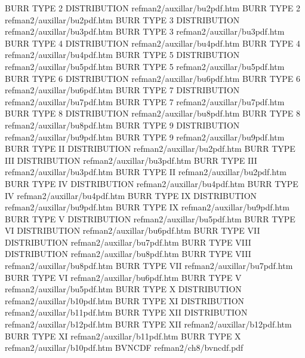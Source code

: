 BURR TYPE 2 DISTRIBUTION                refman2/auxillar/bu2pdf.htm
BURR TYPE 2                             refman2/auxillar/bu2pdf.htm
BURR TYPE 3 DISTRIBUTION                refman2/auxillar/bu3pdf.htm
BURR TYPE 3                             refman2/auxillar/bu3pdf.htm
BURR TYPE 4 DISTRIBUTION                refman2/auxillar/bu4pdf.htm
BURR TYPE 4                             refman2/auxillar/bu4pdf.htm
BURR TYPE 5 DISTRIBUTION                refman2/auxillar/bu5pdf.htm
BURR TYPE 5                             refman2/auxillar/bu5pdf.htm
BURR TYPE 6 DISTRIBUTION                refman2/auxillar/bu6pdf.htm
BURR TYPE 6                             refman2/auxillar/bu6pdf.htm
BURR TYPE 7 DISTRIBUTION                refman2/auxillar/bu7pdf.htm
BURR TYPE 7                             refman2/auxillar/bu7pdf.htm
BURR TYPE 8 DISTRIBUTION                refman2/auxillar/bu8pdf.htm
BURR TYPE 8                             refman2/auxillar/bu8pdf.htm
BURR TYPE 9 DISTRIBUTION                refman2/auxillar/bu9pdf.htm
BURR TYPE 9                             refman2/auxillar/bu9pdf.htm
BURR TYPE II DISTRIBUTION               refman2/auxillar/bu2pdf.htm
BURR TYPE III DISTRIBUTION              refman2/auxillar/bu3pdf.htm
BURR TYPE III                           refman2/auxillar/bu3pdf.htm
BURR TYPE II                            refman2/auxillar/bu2pdf.htm
BURR TYPE IV DISTRIBUTION               refman2/auxillar/bu4pdf.htm
BURR TYPE IV                            refman2/auxillar/bu4pdf.htm
BURR TYPE IX DISTRIBUTION               refman2/auxillar/bu9pdf.htm
BURR TYPE IX                            refman2/auxillar/bu9pdf.htm
BURR TYPE V DISTRIBUTION                refman2/auxillar/bu5pdf.htm
BURR TYPE VI DISTRIBUTION               refman2/auxillar/bu6pdf.htm
BURR TYPE VII DISTRIBUTION              refman2/auxillar/bu7pdf.htm
BURR TYPE VIII DISTRIBUTION             refman2/auxillar/bu8pdf.htm
BURR TYPE VIII                          refman2/auxillar/bu8pdf.htm
BURR TYPE VII                           refman2/auxillar/bu7pdf.htm
BURR TYPE VI                            refman2/auxillar/bu6pdf.htm
BURR TYPE V                             refman2/auxillar/bu5pdf.htm
BURR TYPE X DISTRIBUTION                refman2/auxillar/b10pdf.htm
BURR TYPE XI DISTRIBUTION               refman2/auxillar/b11pdf.htm
BURR TYPE XII DISTRIBUTION              refman2/auxillar/b12pdf.htm
BURR TYPE XII                           refman2/auxillar/b12pdf.htm
BURR TYPE XI                            refman2/auxillar/b11pdf.htm
BURR TYPE X                             refman2/auxillar/b10pdf.htm
BVNCDF                                  refman2/ch8/bvncdf.pdf

